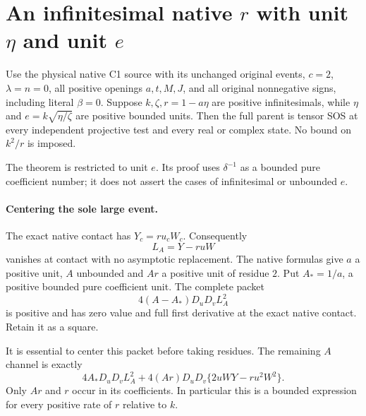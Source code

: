 \section[An infinitesimal native r with unit eta and unit e]{An infinitesimal native $r$ with unit $\eta$ and unit $e$}

\begin{theorem}
Use the physical native C1 source with its unchanged original events,
$c=2$, $\lambda=n=0$, all positive openings $a,t,M,J$, and all original
nonnegative signs, including literal $\beta=0$.
Suppose $k,\zeta,r=1-a\eta$ are positive infinitesimals, while
$\eta$ and $e=k\sqrt{\eta/\zeta}$ are positive bounded units.
Then the full parent is tensor SOS at every independent projective test
and every real or complex state. No bound on $k^2/r$ is imposed.
\end{theorem}

The theorem is restricted to unit $e$. Its proof uses $\delta^{-1}$
as a bounded pure coefficient number; it does not assert the cases of
infinitesimal or unbounded $e$.

\paragraph{Centering the sole large event.}
The exact native contact has $Y_c=r u_cW_c$. Consequently
\[
 L_A=Y-r uW
\]
vanishes at contact with no asymptotic replacement. The native formulas
give $a$ a positive unit, $A$ unbounded and $Ar$ a positive unit of
residue $2$. Put $A_*=1/a$, a positive bounded pure coefficient unit.
The complete packet
\[
             4(A-A_*)D_uD_v L_A^2                         \tag{CA1}
\]
is positive and has zero value and full first derivative at the exact
native contact. Retain it as a square.

It is essential to center this packet before taking residues.
The remaining $A$ channel is exactly
\[
 4A_*D_uD_vL_A^2+
 4(Ar)D_uD_v\{2uWY-r u^2W^2\}.                         \tag{CA2}
\]
Only $Ar$ and $r$ occur in its coefficients. In particular this is a
bounded expression for every positive rate of $r$ relative to $k$.

